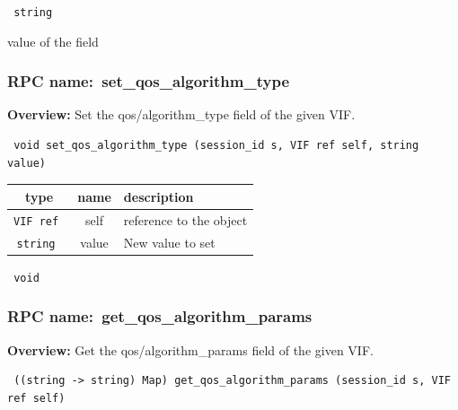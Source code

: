 \vspace{0.3cm}

{\tt 
string
}


value of the field
\vspace{0.3cm}
\vspace{0.3cm}
\vspace{0.3cm}
\subsubsection{RPC name:~set\_qos\_algorithm\_type}

{\bf Overview:} 
Set the qos/algorithm\_type field of the given VIF.

\begin{verbatim} void set_qos_algorithm_type (session_id s, VIF ref self, string value)\end{verbatim}



 
\vspace{0.3cm}
\begin{tabular}{|c|c|p{7cm}|}
 \hline
{\bf type} & {\bf name} & {\bf description} \\ \hline
{\tt VIF ref } & self & reference to the object \\ \hline 

{\tt string } & value & New value to set \\ \hline 

\end{tabular}

\vspace{0.3cm}

{\tt 
void
}



\vspace{0.3cm}
\vspace{0.3cm}
\vspace{0.3cm}
\subsubsection{RPC name:~get\_qos\_algorithm\_params}

{\bf Overview:} 
Get the qos/algorithm\_params field of the given VIF.

\begin{verbatim} ((string -> string) Map) get_qos_algorithm_params (session_id s, VIF ref self)\end{verbatim}


